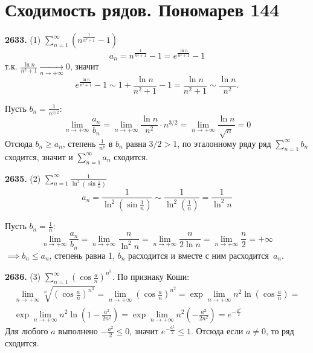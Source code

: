 \documentclass[12pt, oneside]{memoir}
\renewcommand{\le}{\leqslant}
\renewcommand{\ge}{\geqslant}
\begin{document}
\section*{Сходимость рядов. Пономарев 144}

\textbf{2633.} (1) $\displaystyle \sum_{n=1}^\infty \left(n^{\frac{1}{n^2 +1}} -1\right)$
\[a_n = n^{\frac{1}{n^2 +1}} - 1 = e^{\frac{\ln n }{n^2 + 1}} - 1\]
т.к. $\frac{\ln n }{n^2 + 1} \xrightarrow[n \to +\infty]{} 0$, значит
\[e^{\frac{\ln n }{n^2 + 1}} - 1 \sim 1 + \frac{\ln n }{n^2 + 1} - 1  = \frac{\ln n }{n^2 + 1} \sim \frac{\ln n }{n^2} .\]

Пусть $b_n = \frac{1}{n^{3/2}}$:
\[\lim_{n \to +\infty} \frac{a_n}{b_n} = \lim_{n \to +\infty} \frac{\ln n}{n^2} \cdot n^{3/2} =
    \lim_{n \to +\infty} \frac{\ln n}{\sqrt{n}} = 0\]
Отсюда $b_n \ge a_n$, степень $\frac{1}{n^p}$ в $b_n$ равна $3/2 > 1$, по эталонному ряду ряд $\displaystyle \sum_{n=1}^\infty b_n$ сходится,
значит и $\displaystyle \sum_{n=1}^\infty a_n$ сходится.

\textbf{2635.} (2) $\displaystyle \sum_{n=1}^\infty \frac{1}{\ln^2\left(\sin \frac{1}{n}\right)}$
\[a_n = \frac{1}{\ln^2\left(\sin \frac{1}{n}\right)} \sim \frac{1}{\ln^2\left(\frac{1}{n}\right)} = \frac{1}{\ln^2 n}\]

Пусть $b_n = \frac{1}{n}$:
\[\lim_{n \to +\infty} \frac{a_n}{b_n} = \lim_{n \to +\infty} \frac{n}{\ln^2 n} = \lim_{n \to +\infty} \frac{n}{2 \ln n} = \lim_{n \to +\infty} \frac{n}{2} = +\infty\]
$\implies b_n \le a_n$, степень равна 1, $b_n$ расходится и вместе с ним расходится~$a_n$.

\textbf{2636.} (3) $\displaystyle \sum_{n=1}^\infty \left(\cos \frac{a}{n}\right)^{n^3}$.
По признаку Коши:
\begin{multline*}
    \lim_{n \to +\infty} \sqrt[n]{\left(\cos \frac{a}{n}\right)^{n^3}} =
    \lim_{n \to +\infty}  \left(\cos \frac{a}{n}\right)^{n^2} =
    \exp \lim_{n \to +\infty} n^2 \ln \left(\cos \frac{a}{n}\right) =\\
    \exp \lim_{n \to +\infty} n^2 \ln \left(1 -\frac{a^2}{2n^2}\right) =
    \exp \lim_{n \to +\infty} n^2 \left( -\frac{a^2}{2n^2}\right) =
    e^{- \frac{a^2}{2}}
\end{multline*}
Для любого $a$ выполнено $- \frac{a^2}{2} \le 0$, значит $e^{- \frac{a^2}{2}} \le 1$.
Отсюда если $a \neq 0$, то ряд сходится.
\end{document}
